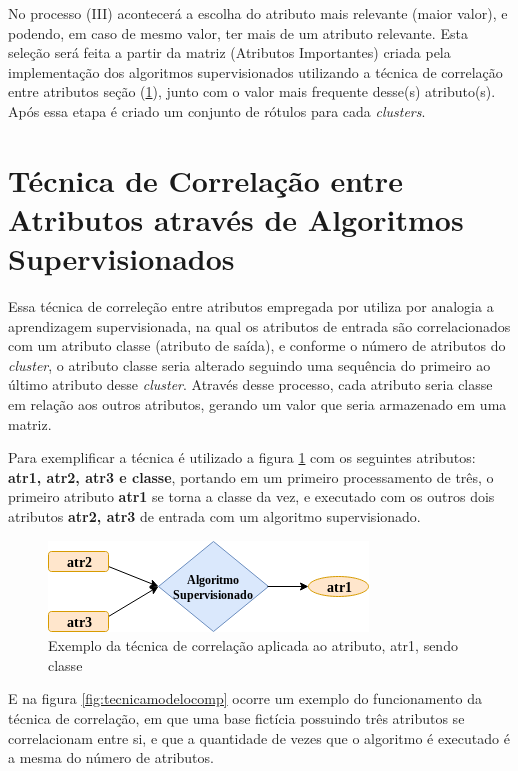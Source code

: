 No processo (III) acontecerá a escolha do atributo mais relevante (maior valor), e podendo, em caso de mesmo valor, ter mais de um atributo relevante. Esta seleção será feita a partir da matriz (Atributos Importantes) criada pela implementação dos algoritmos supervisionados utilizando a técnica de correlação entre atributos seção (\ref{cap:ferramentas:sec:tecnica}), junto com o valor mais frequente desse(s) atributo(s). Após essa etapa é criado um conjunto de rótulos para cada \textit{clusters}. 

\section{Técnica de Correlação entre Atributos através de Algoritmos Supervisionados}\label{cap:ferramentas:sec:tecnica}

Essa técnica de correleção entre atributos empregada por \cite{Lopes2016} utiliza por analogia a aprendizagem supervisionada, na qual os atributos de entrada são correlacionados com um atributo classe (atributo de saída), e conforme o número de atributos do \textit{cluster}, o atributo classe seria alterado seguindo uma sequência do primeiro ao último atributo desse \textit{cluster}. Através desse processo, cada atributo seria classe em relação aos outros atributos, gerando um valor que seria armazenado em uma matriz. 

Para exemplificar a técnica é utilizado a figura \ref{fig:tecnicamodelo} com os seguintes atributos: \textbf{atr1, atr2, atr3 e classe}, portando em um primeiro processamento de três, o primeiro atributo \textbf{atr1} se torna a classe da vez, e executado com os outros dois atributos \textbf{atr2, atr3} de entrada com um algoritmo supervisionado.

\begin{figure}[h!]
        \centering
        \includegraphics[scale=0.7]{figs/tecnicamodelo.png}
        \caption{Exemplo da técnica de correlação aplicada ao atributo, atr1, sendo classe } \label{fig:tecnicamodelo}
\end{figure}

E na figura \ref{fig:tecnicamodelocomp} ocorre um exemplo do funcionamento da técnica de correlação, em que uma base fictícia possuindo três atributos se correlacionam entre si, e que a quantidade de vezes que o algoritmo é executado é a mesma do número de atributos.

